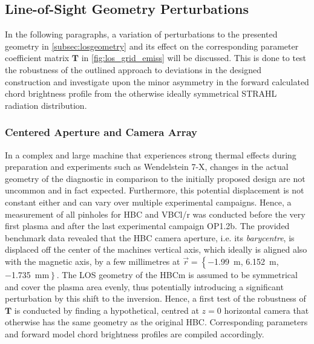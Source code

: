         \subsection{Line-of-Sight Geometry Perturbations}\label{subsec:geompertub}%
%
        In the following paragraphs, a variation of perturbations to the presented geometry in \cref{subsec:losgeometry} and its effect on the corresponding parameter coefficient matrix $\mathbf{T}$ in \cref{fig:los_grid_emiss} will be discussed. This is done to test the robustness of the outlined approach to deviations in the designed construction and investigate upon the minor asymmetry in the forward calculated chord brightness profile from the otherwise ideally symmetrical STRAHL radiation distribution.%
%
        \subsubsection*{Centered Aperture and Camera Array}%
%
            In a complex and large machine that experiences strong thermal effects during preparation and experiments such as Wendelstein 7-X, changes in the actual geometry of the diagnostic in comparison to the initially proposed design are not uncommon and in fact expected. Furthermore, this potential displacement is not constant either and can vary over multiple experimental campaigns. Hence, a measurement of all pinholes for HBC and VBCl/r was conducted before the very first plasma and after the last experimental campaign OP1.2b. The provided benchmark data revealed that the HBC camera aperture, i.e. its \textit{barycentre}, is displaced off the center of the machines vertical axis, which ideally is aligned also with the magnetic axis, by a few millimetres at $\vec{r}=\left\{\right.$\SI{-1.99}{\meter}, \SI{6.152}{\meter}, \SI{-1.735}{\milli\meter}$\left.\right\}$. The LOS geometry of the HBCm is assumed to be symmetrical and cover the plasma area evenly, thus potentially introducing a significant perturbation by this shift to the inversion. Hence, a first test of the robustness of $\mathbf{T}$ is conducted by finding a hypothetical, centred at $z=0$ horizontal camera that otherwise has the same geometry as the original HBC. Corresponding parameters and forward model chord brightness profiles are compiled accordingly.\\%
%
